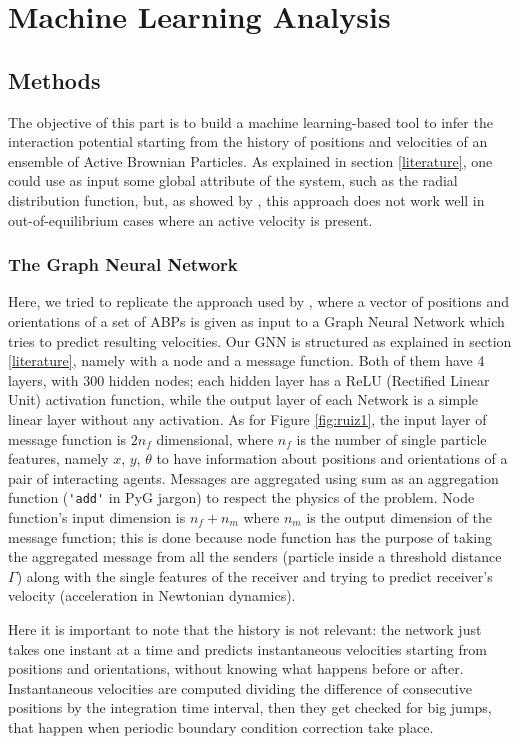 \documentclass[../../master_thesis_np.tex]{subfiles}
\begin{document}
\chapter{Machine Learning Analysis}
\section{Methods}
The objective of this part is to build a machine learning-based tool to infer the interaction potential starting from the history of positions and velocities of an ensemble of Active Brownian Particles.
As explained in section \ref{literature}, one could use as input some global attribute of the system, such as the radial distribution function, but, as showed by \citeauthor{bag_interaction_2021}, this approach does not work well in out-of-equilibrium cases where an active velocity is present.

\subsection{The Graph Neural Network}
Here, we tried to replicate the approach used by \citeauthor{ruiz-garcia_discovering_2024}, where a vector of positions and orientations of a set of ABPs is given as input to a Graph Neural Network which tries to predict resulting velocities.
Our GNN is structured as explained in section \ref{literature}, namely with a node and a message function. 
Both of them have 4 layers, with 300 hidden nodes; each hidden layer has a ReLU (Rectified Linear Unit) activation function, while the output layer of each Network is a simple linear layer without any activation.
As for Figure \ref{fig:ruiz1}, the input layer of message function is $2n_f$ dimensional, where $n_f$ is the number of single particle features, namely $x$, $y$, $\theta$ to have information about positions and orientations of a pair of interacting agents.
Messages are aggregated using sum as an aggregation function (\verb|'add'| in PyG jargon) to respect the physics of the problem.
Node function's input dimension is $n_f + n_m$ where $n_m$ is the output dimension of the message function; this is done because node function has the purpose of taking the aggregated message from all the senders (particle inside a threshold distance $\Gamma$) along with the single features of the receiver and trying to predict receiver's velocity (acceleration in Newtonian dynamics).

Here it is important to note that the history is not relevant: the network just takes one instant at a time and predicts instantaneous velocities starting from positions and orientations, without knowing what happens before or after.
Instantaneous velocities are computed dividing the difference of consecutive positions by the integration time interval, then they get checked for big jumps, that happen when periodic boundary condition correction take place.
\end{document}
